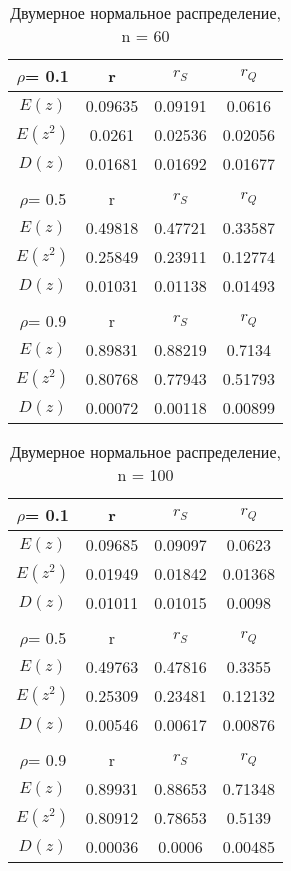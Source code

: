 \documentclass[12pt,a4paper]{scrartcl}
\begin{document}
\begin{table}[H]
\centering
\begin{tabular}{| c | c | c | c |}
\hline
 $\rho$= 0.1 & r       & $r_S$   & $r_Q$   \\ \hline
 $E(z)$      & 0.09635 & 0.09191 & 0.0616  \\ \hline
 $E(z^2)$    & 0.0261  & 0.02536 & 0.02056 \\ \hline
 $D(z)$      & 0.01681 & 0.01692 & 0.01677 \\ \hline
&  & & \\  \hline
 $\rho$= 0.5 & r       & $r_S$   & $r_Q$   \\ \hline
 $E(z)$      & 0.49818 & 0.47721 & 0.33587 \\ \hline
 $E(z^2)$    & 0.25849 & 0.23911 & 0.12774 \\ \hline
 $D(z)$      & 0.01031 & 0.01138 & 0.01493 \\ \hline
&  & & \\  \hline
 $\rho$= 0.9 & r       & $r_S$   & $r_Q$   \\ \hline
 $E(z)$      & 0.89831 & 0.88219 & 0.7134  \\ \hline
 $E(z^2)$    & 0.80768 & 0.77943 & 0.51793 \\ \hline
 $D(z)$      & 0.00072 & 0.00118 & 0.00899 \\
\hline
\end{tabular}
 \caption{Двумерное нормальное распределение, n = 60}
\label{tab:norm_60}
\end{table}

\begin{table}[H]
\centering
\begin{tabular}{| c | c | c | c |}
\hline
 $\rho$= 0.1 & r       & $r_S$   & $r_Q$   \\ \hline
 $E(z)$      & 0.09685 & 0.09097 & 0.0623  \\ \hline
 $E(z^2)$    & 0.01949 & 0.01842 & 0.01368 \\ \hline
 $D(z)$      & 0.01011 & 0.01015 & 0.0098  \\ \hline
&  & & \\  \hline
 $\rho$= 0.5 & r       & $r_S$   & $r_Q$   \\ \hline
 $E(z)$      & 0.49763 & 0.47816 & 0.3355  \\ \hline
 $E(z^2)$    & 0.25309 & 0.23481 & 0.12132 \\ \hline
 $D(z)$      & 0.00546 & 0.00617 & 0.00876 \\ \hline
&  & & \\  \hline
 $\rho$= 0.9 & r       & $r_S$   & $r_Q$   \\ \hline
 $E(z)$      & 0.89931 & 0.88653 & 0.71348 \\ \hline
 $E(z^2)$    & 0.80912 & 0.78653 & 0.5139  \\ \hline
 $D(z)$      & 0.00036 & 0.0006  & 0.00485 \\
\hline
\end{tabular}
 \caption{Двумерное нормальное распределение, n = 100}
\label{tab:norm_100}
\end{table}
\end{document}
